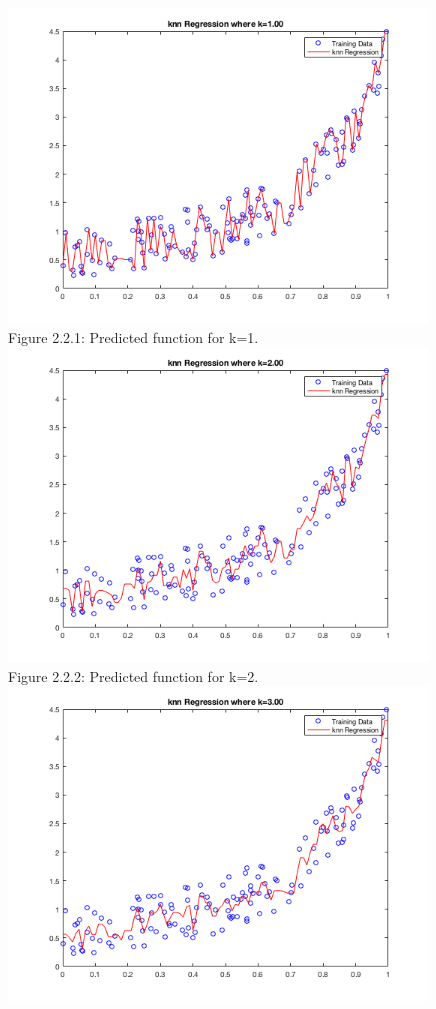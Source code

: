 \documentclass[]{scrreprt}   %
\begin{document}
\begin{center}
	\includegraphics[width=30em,keepaspectratio]{p2figure1.png}\\
	{Figure 2.2.1: Predicted function for k=1.}
	\includegraphics[width=30em,keepaspectratio]{p2figure2.png}\\
	{Figure 2.2.2: Predicted function for k=2.}
	\includegraphics[width=30em,keepaspectratio]{p2figure3.png}\\

\end{center}
\end{document}

